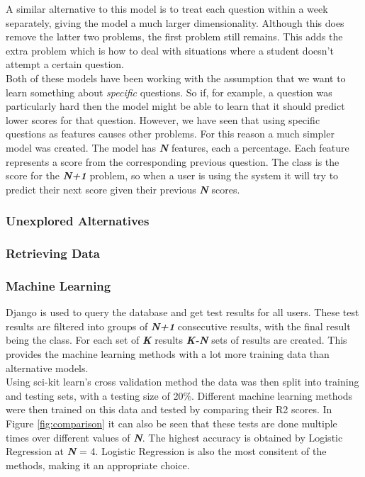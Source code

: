 A similar alternative to this model is to treat each question within a week separately, giving the model a much larger dimensionality. Although this does remove the latter two problems, the first problem still remains. This adds the extra problem which is how to deal with situations where a student doesn't attempt a certain question.
\\
Both of these models have been working with the assumption that we want to learn something about \emph{specific} questions. So if, for example, a question was particularly hard then the model might be able to learn that it should predict lower scores for that question. However, we have seen that using specific questions as features causes other problems. For this reason a much simpler model was created. The model has \textit{\textbf{N}} features, each a percentage. Each feature represents a score from the corresponding previous question. The class is the score for the \textit{\textbf{N+1}} problem, so when a user is using the system it will try to predict their next score given their previous \textit{\textbf{N}} scores.

\subsubsection{Unexplored Alternatives}

\subsubsection{Retrieving Data}


\subsubsection{Machine Learning}
Django is used to query the database and get test results for all users. These test results are filtered into groups of \textit{\textbf{N+1}} consecutive results, with the final result being the class. For each set of \textit{\textbf{K}} results \textit{\textbf{K-N}} sets of results are created. This provides the machine learning methods with a lot more training data than alternative models.
\\%
Using sci-kit learn's cross validation method the data was then split into training and testing sets, with a testing size of 20\%. Different machine learning methods were then trained on this data and tested by comparing their R2 scores. In Figure \ref{fig:comparison} it can also be seen that these tests are done multiple times over different values of \textit{\textbf{N}}. The highest accuracy is obtained by Logistic Regression at \textit{\textbf{N}} = 4. Logistic Regression is also the most consitent of the methods, making it an appropriate choice.

